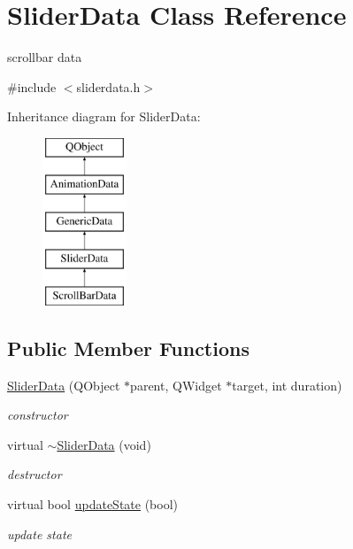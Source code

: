 \hypertarget{class_slider_data}{}\section{Slider\+Data Class Reference}
\label{class_slider_data}


scrollbar data  




{\ttfamily \#include $<$sliderdata.\+h$>$}

Inheritance diagram for Slider\+Data\+:\begin{figure}[H]
\begin{center}
\leavevmode
\includegraphics[height=5.000000cm]{class_slider_data}
\end{center}
\end{figure}
\subsection*{Public Member Functions}
\begin{DoxyCompactItemize}
\item 
\mbox{\label{class_slider_data_ae374ffc5fea9041f0f4817d1719918f3}} 
\hyperlink{class_slider_data_ae374ffc5fea9041f0f4817d1719918f3}{Slider\+Data} (Q\+Object $\ast$parent, Q\+Widget $\ast$target, int duration)
\begin{DoxyCompactList}\small\item\em constructor \end{DoxyCompactList}\item 
\mbox{\label{class_slider_data_ac9d80e05fc0ed7d878598f3f75afb140}} 
virtual \hyperlink{class_slider_data_ac9d80e05fc0ed7d878598f3f75afb140}{$\sim$\+Slider\+Data} (void)
\begin{DoxyCompactList}\small\item\em destructor \end{DoxyCompactList}\item 
\mbox{\label{class_slider_data_ac015a6738eb9aada237b484fc77f6152}} 
virtual bool \hyperlink{class_slider_data_ac015a6738eb9aada237b484fc77f6152}{update\+State} (bool)
\begin{DoxyCompactList}\small\item\em update state \end{DoxyCompactList}\end{DoxyCompactItemize}
